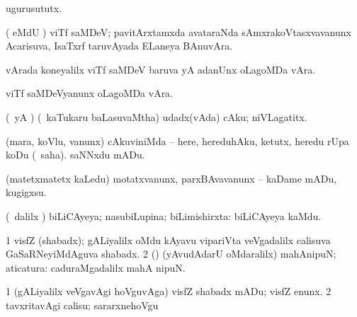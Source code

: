 {{{{{{\bentry
{}
  \gl{\nA}\bmng
ugurusututx. 
\emng
\eentry

\bentry
{} 
\gl{\nA}
\expl{}
\bmng
{} 
\emng
\eentry

\bentry
{} 
\gl{\gu}
\expl{}
\bmng
{} 
\emng
\eentry

\bentry
{} 
\gl{\nA}
\expl{}
\bmng
( eMdU \parx) viTf saMDeV; pavitArxtamxda avataraNda sAmxrakoVtasxvavanunx Acarisuva, IsaTxrf taruvAyada ELaneya BAnuvAra. 
\emng
\eentry

\bentry
{}
  \gl{\nA}\bmng
vArada koneyalilx viTf saMDeV baruva yA adanUnx oLagoMDa vAra. 
\emng
\eentry

\bentry
{}
\gl{\nA}
\bmng
viTf saMDeVyanunx oLagoMDa vAra. 
\emng
\eentry

\bentry
{} 
\gl{\nA}
\expl{}
\bmng
(\pArxparx\ yA \pArxM) (\kanmu\ kaTukaru baLasuvaMtha) udadx(vAda) cAku; niVLagatitx. 
\emng
\eentry

\bentry
{} 
\gl{\sakirx}
\expl{}
\bmng
(mara, koVlu, \mo vanunx) 
\banum
{} cAkuviniMda -- here, hereduhAku, ketutx, heredu rUpa koDu (\akirx\ saha). 
 saNNxdu mADu. 
\eanum
\emng

\noindent
\gl{\pagu}
\bmng
{} (matetxmatetx kaLedu) motatxvanunx, parxBAvavanunx -- kaDame mADu, kugigxsu. 
\emng
\eentry

\bentry
{} 
\gl{\gu}
\expl{}
\bmng
(\sA\ \saMpa dalilx \parx) biLiCAyeya; nasubiLupina; biLimishirxta:  biLiCAyeya kaMdu. 
\emng
\eentry

\bentry
{} 
\gl{\nA}
\expl{}
\bmng
\bnum
\num{1} visfZ (shabadx); gALiyalilx oMdu kAyavu vipariVta veVgadalilx calisuva GaSaRNeyiMdAguva shabadx. 
\num{2} (\AmA) (yAvudAdarU oMdaralilx) mahAnipuN; aticatura:  caduraMgadalilx mahA nipuN. 
\enum
\emng
\eentry

\bentry
{} 
\gl{\akirx}
\bmng
\bnum
\num{1} (gALiyalilx veVgavAgi hoVguvAga) visfZ shabadx mADu; visfZ enunx. 
\num{2} tavxritavAgi calisu; sararxnehoVgu 
\enum
\emng
\eentry

}}}}}}
